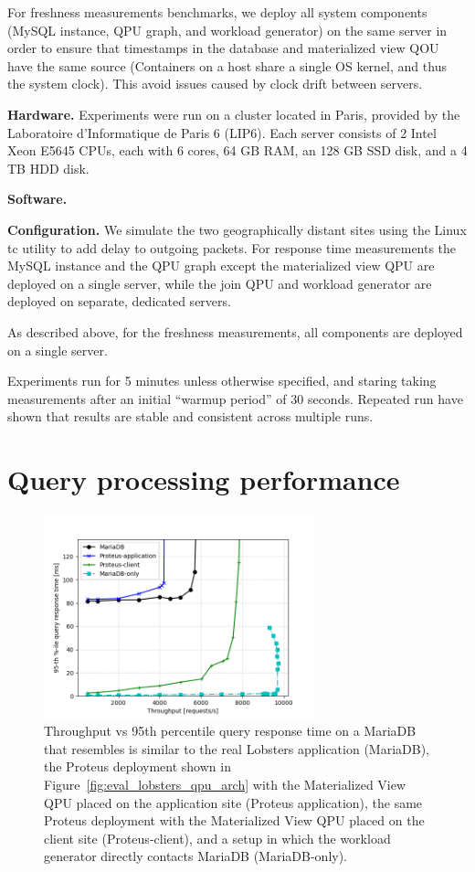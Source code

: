 For freshness measurements benchmarks,
we deploy all system components (MySQL instance, QPU graph, and workload generator) on the same server in order to ensure
that timestamps in the database and materialized view QOU have the same source (Containers on a host share a single OS
kernel, and thus the system clock).
This avoid issues caused by clock drift between servers.

\bigskip
\noindent
\textbf{Hardware.}
Experiments were run on a cluster located in Paris, provided by the Laboratoire d'Informatique de Paris 6 (LIP6).
Each server consists of 2 Intel Xeon E5645 CPUs, each with 6 cores, 64 GB RAM, an 128 GB SSD disk, and a 4 TB HDD disk.

\bigskip
\noindent
\textbf{Software.}

\bigskip
\noindent
\textbf{Configuration.}
We simulate the two geographically distant sites using the Linux tc utility \cite{tc} to add delay to outgoing packets.
For response time measurements the MySQL instance and the QPU graph except the materialized view QPU are deployed on a single
server, while the join QPU and workload generator are deployed on separate, dedicated servers.

As described above, for the freshness measurements, all components are deployed on a single server.

Experiments run for 5 minutes unless otherwise specified, and staring taking measurements after an initial ``warmup period''
of 30 seconds.
Repeated run have shown that results are stable and consistent across multiple runs.

\section{Query processing performance}

\begin{figure}
\centering
  \includegraphics[width=0.7\textwidth]{./figures/evaluation/responseTime.png}
  \caption{Throughput vs 95th percentile query response time on a MariaDB that resembles is similar to the real Lobsters application (MariaDB), the Proteus deployment shown in Figure~\ref{fig:eval_lobsters_qpu_arch}
  with the Materialized View QPU placed on the application site (Proteus application), the same Proteus deployment with the Materialized View QPU placed on the client site (Proteus-client),
  and a setup in which the workload generator directly contacts MariaDB (MariaDB-only).}
  \label{fig:responseTime}
\end{figure}

